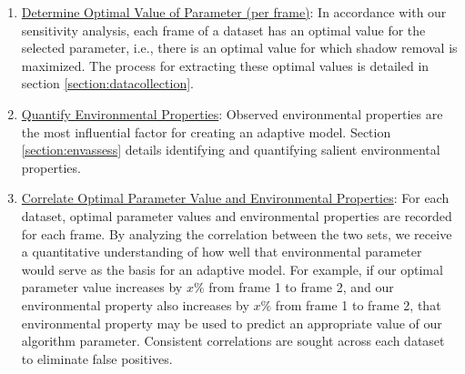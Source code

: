 \begin{enumerate}


\item \underline{Determine Optimal Value of Parameter (per frame)}: In accordance with our sensitivity analysis, each frame of a dataset has an optimal value for the selected parameter, i.e., there is an optimal value for which shadow removal is maximized. The process for extracting these optimal values is detailed in section \ref{section:datacollection}.

\item \underline{Quantify Environmental Properties}: Observed environmental properties are the most influential factor for creating an adaptive model. Section \ref{section:envassess} details identifying and quantifying salient environmental properties. 


\item \underline{Correlate Optimal Parameter Value and Environmental Properties}: For each dataset, optimal parameter values and environmental properties are recorded for each frame. By analyzing the correlation between the two sets, we receive a quantitative understanding of how well that environmental parameter would serve as the basis for an adaptive model. For example, if our optimal parameter value increases by $x\%$ from frame 1 to frame 2, and our environmental property also increases by $x\%$ from frame 1 to frame 2, that environmental property may be used to predict an appropriate value of our algorithm parameter. Consistent correlations are sought across each dataset to eliminate false positives.


\end{enumerate}
